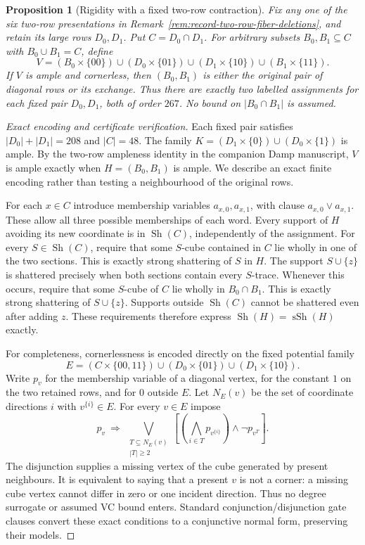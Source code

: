 \documentclass[11pt]{article}
\numberwithin{equation}{section}
\newtheorem{proposition}[theorem]{Proposition}
\theoremstyle{definition}
\theoremstyle{remark}
\newcommand{\Sh}{\operatorname{Sh}}
\begin{document}
\begin{proposition}[Rigidity with a fixed two-row contraction]
\label{prop:record-fixed-contraction-rigidity}
Fix any one of the six two-row presentations in
Remark~\ref{rem:record-two-row-fiber-deletions}, and retain its large
rows $D_0,D_1$. Put $C=D_0\cap D_1$. For arbitrary subsets
$B_0,B_1\subseteq C$ with $B_0\cup B_1=C$, define
\[
 V=(B_0\times\{00\})\cup(D_0\times\{01\})
   \cup(D_1\times\{10\})\cup(B_1\times\{11\}).
\]
If $V$ is ample and cornerless, then $(B_0,B_1)$ is either the original
pair of diagonal rows or its exchange. Thus there are exactly two
labelled assignments for each fixed pair $D_0,D_1$, both of order $267$.
No bound on $|B_0\cap B_1|$ is assumed.
\end{proposition}
\begin{proof}[Exact encoding and certificate verification]
Each fixed pair satisfies $|D_0|+|D_1|=208$ and $|C|=48$.
The family $K=(D_1\times\{0\})\cup(D_0\times\{1\})$ is ample.
By the two-row ampleness identity in the companion Damp manuscript,
$V$ is ample exactly when $H=(B_0,B_1)$ is ample. We describe an exact
finite encoding rather than testing a neighbourhood of the original rows.

For each $x\in C$ introduce membership variables $a_{x,0},a_{x,1}$,
with clause $a_{x,0}\vee a_{x,1}$. These allow all three possible
memberships of each word. Every support of $H$ avoiding its new coordinate
is in $\Sh(C)$, independently of the assignment. For every $S\in\Sh(C)$,
require that some $S$-cube contained in $C$ lie wholly in one of the two
sections. This is exactly strong shattering of $S$ in $H$.
The support $S\cup\{z\}$ is shattered precisely when both sections
contain every $S$-trace. Whenever this occurs, require that some
$S$-cube of $C$ lie wholly in $B_0\cap B_1$. This is exactly strong
shattering of $S\cup\{z\}$. Supports outside $\Sh(C)$ cannot be
shattered even after adding $z$. These requirements therefore express
$\Sh(H)=\operatorname{sSh}(H)$ exactly.

For completeness, cornerlessness is encoded directly on the fixed
potential family
\[
 E=(C\times\{00,11\})\cup(D_0\times\{01\})
   \cup(D_1\times\{10\}).
\]
Write $p_v$ for the membership variable of a diagonal vertex, for the
constant $1$ on the two retained rows, and for $0$ outside $E$.
Let $N_E(v)$ be the set of coordinate directions $i$ with
$v^{\{i\}}\in E$. For every $v\in E$ impose
\[
 p_v\ \Longrightarrow\
 \bigvee_{\substack{T\subseteq N_E(v)\\ |T|\ge2}}
 \left[\left(\bigwedge_{i\in T}p_{v^{\{i\}}}\right)
 \wedge\neg p_{v^T}\right].
\]
The disjunction supplies a missing vertex of the cube generated by
present neighbours. It is equivalent to saying that a present $v$ is
not a corner: a missing cube vertex cannot differ in zero or one
incident direction. Thus no degree surrogate or assumed VC bound enters.
Standard conjunction/disjunction gate clauses convert these exact
conditions to a conjunctive normal form, preserving their models.


\end{proof}
\end{document}
